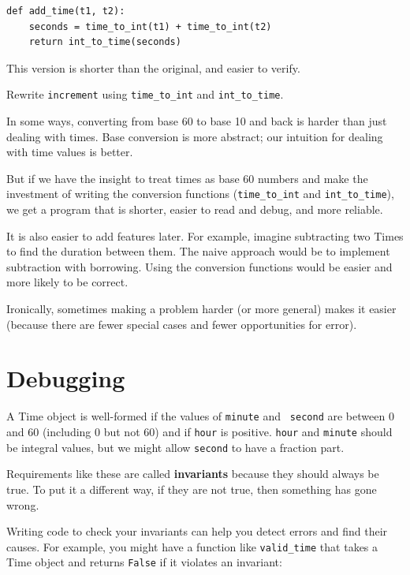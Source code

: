 \documentclass[10pt]{book}
\begin{document}
\begin{CJK}{UTF8}{gbsn}
\begin{verbatim}
def add_time(t1, t2):
    seconds = time_to_int(t1) + time_to_int(t2)
    return int_to_time(seconds)
\end{verbatim}
%
This version is shorter than the original, and easier to verify.

\begin{exercise}

Rewrite {\tt increment} using \verb"time_to_int" and \verb"int_to_time".

\end{exercise}

In some ways, converting from base 60 to base 10 and back is harder
than just dealing with times.  Base conversion is more abstract; our
intuition for dealing with time values is better.

But if we have the insight to treat times as base 60 numbers and make
the investment of writing the conversion functions (\verb"time_to_int"
and \verb"int_to_time"), we get a program that is shorter, easier to
read and debug, and more reliable.

It is also easier to add features later.  For example, imagine
subtracting two Times to find the duration between them.  The
naive approach would be to implement subtraction with borrowing.
Using the conversion functions would be easier and more likely to be
correct.

Ironically, sometimes making a problem harder (or more general) makes it
easier (because there are fewer special cases and fewer opportunities
for error).


\section{Debugging}

A Time object is well-formed if the values of {\tt minute} and {\tt
second} are between 0 and 60 (including 0 but not 60) and if 
{\tt hour} is positive.  {\tt hour} and {\tt minute} should be
integral values, but we might allow {\tt second} to have a
fraction part.

Requirements like these are called {\bf invariants} because
they should always be true.  To put it a different way, if they
are not true, then something has gone wrong.

Writing code to check your invariants can help you detect errors
and find their causes.  For example, you might have a function
like \verb"valid_time" that takes a Time object and returns
{\tt False} if it violates an invariant:


\end{CJK}
\end{document}
